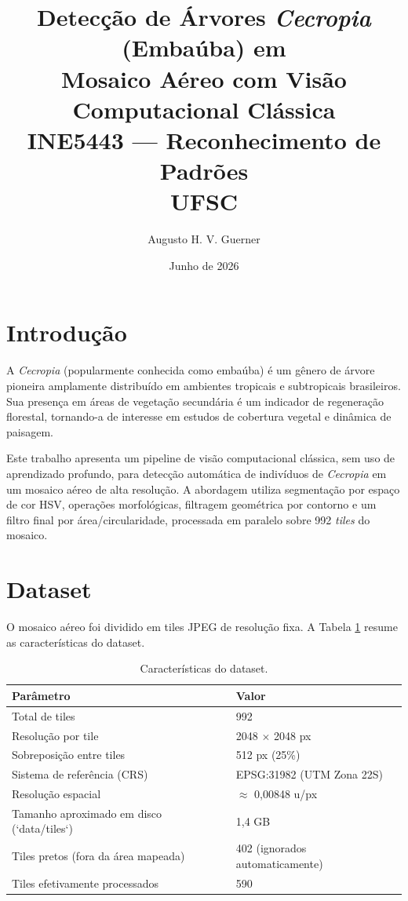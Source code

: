 \documentclass[12pt, a4paper]{article}
\title{
    \textbf{Detecção de Árvores \textit{Cecropia} (Embaúba) em\\
    Mosaico Aéreo com Visão Computacional Clássica}\\[0.5em]
    \large INE5443 — Reconhecimento de Padrões \\ UFSC
}
\author{Augusto H. V. Guerner}
\date{Junho de 2026}
\begin{document}
\maketitle
\tableofcontents
\newpage

\section{Introdução}

A \textit{Cecropia} (popularmente conhecida como embaúba) é um gênero de árvore
pioneira amplamente distribuído em ambientes tropicais e subtropicais
brasileiros. Sua presença em áreas de vegetação secundária é um indicador de
regeneração florestal, tornando-a de interesse em estudos de cobertura vegetal e
dinâmica de paisagem.

Este trabalho apresenta um pipeline de visão computacional clássica, sem uso de
aprendizado profundo, para detecção automática de indivíduos de \textit{Cecropia}
em um mosaico aéreo de alta resolução. A abordagem utiliza segmentação por espaço
de cor HSV, operações morfológicas, filtragem geométrica por contorno e um
filtro final por área/circularidade, processada em paralelo sobre 992
\textit{tiles} do mosaico.

\section{Dataset}

O mosaico aéreo foi dividido em tiles JPEG de resolução fixa. A Tabela
\ref{tab:dataset} resume as características do dataset.

\begin{table}[H]
\centering
\caption{Características do dataset.}
\label{tab:dataset}
\begin{tabular}{ll}
\toprule
\textbf{Parâmetro} & \textbf{Valor} \\
\midrule
Total de tiles & 992 \\
Resolução por tile & 2048 $\times$ 2048 px \\
Sobreposição entre tiles & 512 px (25\%) \\
Sistema de referência (CRS) & EPSG:31982 (UTM Zona 22S) \\
Resolução espacial & $\approx$ 0,00848 u/px \\
Tamanho aproximado em disco (`data/tiles`) & 1,4 GB \\
Tiles pretos (fora da área mapeada) & 402 (ignorados automaticamente) \\
Tiles efetivamente processados & 590 \\
\bottomrule
\end{tabular}
\end{table}
\end{document}
